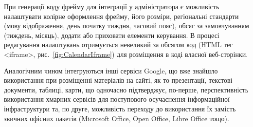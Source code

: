 При генерації коду фрейму для інтеграції у адміністратора є можливість налаштувати колірне оформлення фрейму, його розміри, регіональні стандарти (мову відображення, день початку тиждня, часовий пояс), обсяг за замовчуванням (тиждень, місяць), додати або приховати елементи керування. В процесі редагування налаштувань отримується невеликий за обсягом код (HTML тег <iframe>, рис.~\ref{fig:CalendarIframe}) для розміщення в коді власної веб-сторінки. 


Аналогічним чином інтегруються інші сервіси Google, що вже знайшло використання при розміщенні матеріалів на сайті, як то презентації, текстові документи, таблиці, карти, що одночасно підтверджує, по-перше, перспективність використання хмарних сервісів для поступового осучаснення інформаційної інфраструктури та, по друге, можливість переходу до використання їх замість звичних офісних пакетів (Microsoft Office, Open Office, Libre Office тощо).


